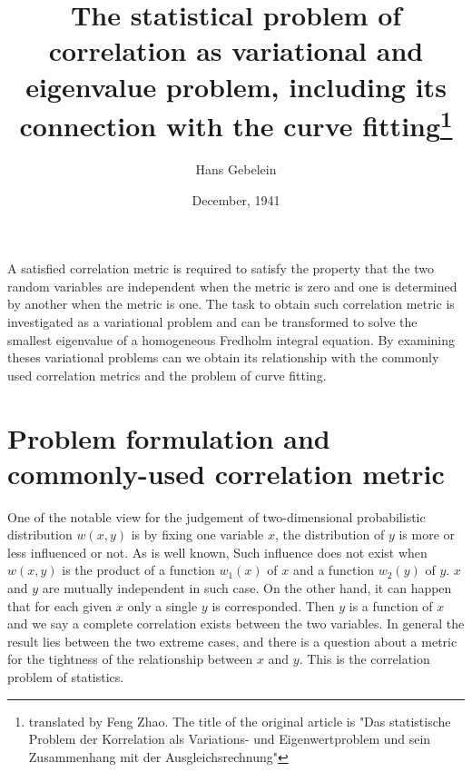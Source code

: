 \documentclass{article}
\title{The statistical problem of correlation as variational and eigenvalue problem, including its connection with the curve fitting\footnote{translated by Feng Zhao. The title of the original article is "Das statistische Problem der Korrelation als Variations- und Eigenwertproblem und sein Zusammenhang mit der Ausgleichsrechnung"}}
\date{December, 1941}
\author{Hans Gebelein}
\begin{document}
\maketitle
\begin{centering}
A satisfied correlation metric is required to satisfy
the property that the two random variables are independent when the metric is zero and one is
determined by another when the metric is one.
The task to obtain such correlation metric is investigated
as a variational problem and can be transformed to solve
the smallest eigenvalue of a homogeneous Fredholm integral equation. By examining theses variational
problems can we obtain its relationship with the commonly used correlation metrics and the problem of curve fitting.
\end{centering}

\section{Problem formulation and commonly-used correlation metric}
One of the notable view for the judgement of two-dimensional probabilistic distribution $w(x,y)$ is by fixing one variable $x$, the distribution of $y$ is more or less influenced or not. As is well known,
Such influence does not exist when $w(x,y)$
is the product of a function $w_1(x)$ of $x$ and
a function $w_2(y)$ of $y$. $x$ and $y$
are mutually independent in such case. On the
other hand, it can happen that for each given $x$
only a single $y$ is corresponded. Then $y$
is a function of $x$ and we say a complete correlation
exists between the two variables. In general the result lies between the two extreme cases, and there is a question about a metric for the tightness of the relationship
between $x$ and $y$. This is the correlation problem of statistics.
\end{document}
